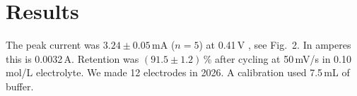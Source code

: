 \section{Results}

The peak current was $3.24 \pm 0.05$\,mA ($n = 5$) at 0.41\,V \cite{smith2021}, see Fig.~2.
In amperes this is 0.0032\,A. %
Retention was $(91.5 \pm 1.2)$\,\% after cycling at 50\,mV/s in 0.10\,mol/L electrolyte.
We made 12 electrodes in 2026.
A calibration used 7.5\,mL of buffer. %
